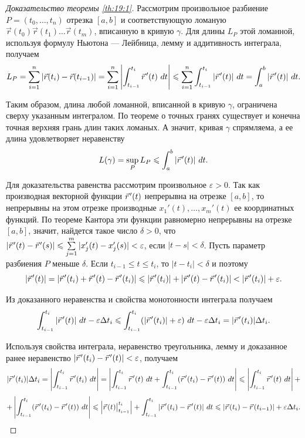 \documentclass[12pt]{report}
\numberwithin{equation}{section}
\newcommand{\pvec}[1]{\vec{#1}\mkern2mu\vphantom{#1}}
\begin{document}
\begin{proof} [Доказательство теоремы \ref{th:19:1}]
Рассмотрим произвольное разбиение $P = (t_0, \ldots, t_n)$ отрезка $[a,b]$ и соответствующую ломаную$\vec{r}(t_0) \vec{r}(t_1) \ldots \vec{r}(t_m)$, вписанную в кривую $\gamma$. Для длины $L_P$ этой ломанной, используя формулу Ньютона --- Лейбница, лемму и аддитивность интеграла, получаем
\[ L_P = \sum_{i=1}^n | \vec{r}(t_i) - \vec{r} (t_{i - 1})| = \sum_{i=1}^n \left| \int_{t_{i-1}}^{t_i} \pvec{r}'(t)~dt \right| \leqslant \sum_{i=1}^n \int_{t_{i-1}}^{t_i} | \pvec{r}'(t)| ~dt = \int_a^b |\pvec{r}'(t)|~dt.\]

Таким образом, длина любой ломанной, вписанной в кривую $\gamma$, ограничена сверху указанным интегралом. По теореме о точных гранях существует и конечна точная верхняя грань длин таких ломаных. А значит, кривая $\gamma$ спрямляема, а ее длина удовлетворяет неравенству
\[ L(\gamma) = \sup_{P}L_P \leqslant \int_a^b |\pvec{r}'(t)|~dt.\]

Для доказательства равенства рассмотрим произвольное $\varepsilon > 0$. Так как производная векторной функции $\pvec{r}'(t)$ непрерывна на отрезке $[a,b]$, то непрерывны на этом отрезке производные $x_1'(t), \ldots, x_m'(t)$ ее координатных функций. По теореме Кантора эти функции равномерно непрерывны на отрезке $[a,b]$, значит, найдется такое число $\delta > 0$, что $|\pvec{r}'(t) - \pvec{r}'(s)| \leqslant \sum\limits_{j=1}^m |x_j'(t) - x_j'(s)| < \varepsilon$, если $|t - s| < \delta$. Пусть параметр разбиения $P$ меньше $\delta$. Если $t_{i-1} \leqslant t \leqslant t_i$, то $|t - t_i| < \delta$ и поэтому
\[ |\pvec{r}'(t)| = |\pvec{r}'(t_i) + \pvec{r}'(t) - \pvec{r}'(t_i) | \leqslant |\pvec{r}'(t_i)| + |\pvec{r}'(t) - \pvec{r}'(t_i)| < |\pvec{r}'(t_i)| + \varepsilon.\]

Из доказанного неравенства и свойства монотонности интеграла получаем
\[ \int_{t_{i-1}}^{t_i} |\pvec{r}'(t)|~dt - \varepsilon \Delta t_i \leqslant \int_{t_{i-1}}^{t_i} (|\pvec{r}'(t_i)| + \varepsilon)~dt - \varepsilon \Delta t_i = |\pvec{r}'(t_i)| \Delta t_i.\]

Используя свойства интеграла, неравенство треугольника, лемму и доказанное ранее неравенство $|\pvec{r}'(t_i) - \pvec{r}'(t)| < \varepsilon$, получаем
\[ |\pvec{r}'(t_i)| \Delta t_i = \left| \int_{t_{i-1}}^{t_i} \pvec{r}'(t_i)~dt \right| = \left| \int_{t_{i-1}}^{t_i} \pvec{r}'(t)~dt  + \int_{t_{i-1}}^{t_i} (\pvec{r}'(t_i) - \pvec{r}'(t))~dt \right| \leqslant \left| \int_{t_{i-1}}^{t_i} \pvec{r}'(t)~dt \right| +\]
\[+ \left| \int_{t_{i-1}}^{t_i} (\pvec{r}'(t_i) - \pvec{r}'(t))~dt \right| \leqslant \left\lvert \pvec{r}(t)\bigr\vert_{t_{i-1}}^{t_i} \right\rvert  + \int_{t_{i-1}}^{t_i} |\pvec{r}'(t_i) - \pvec{r}'(t)| ~dt \leqslant |\pvec{r}(t_i) - \pvec{r}(t_{i-1}) | + \varepsilon \Delta t_i.\]


\end{proof}
\end{document}
